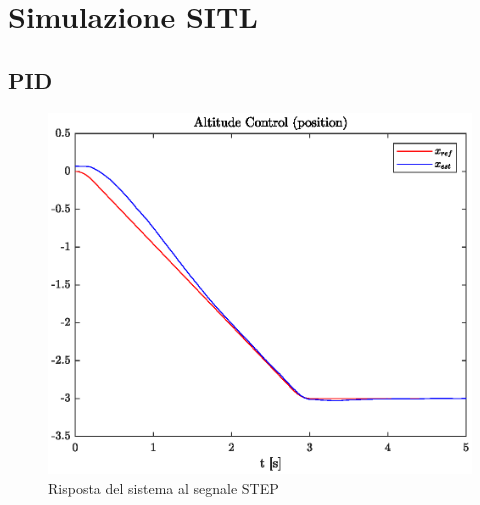 \section{Simulazione SITL}
\subsection{PID}

\begin{figure}
	\centering
	\includegraphics[width=1\textwidth]{Simulazioni/Figure/STEPaltitudecontrolpos}
	\caption{Risposta del sistema al segnale STEP}
\end{figure}
